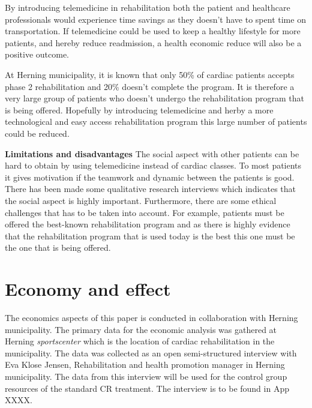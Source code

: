 By introducing telemedicine in rehabilitation both the patient and healthcare professionals would experience time savings as they doesn’t have to spent time on transportation. If telemedicine could be used to keep a healthy lifestyle for more patients, and hereby reduce readmission, a health economic reduce will also be a positive outcome. 

At Herning municipality, it is known that only 50\% of cardiac patients accepts phase 2 rehabilitation and 20\% doesn’t complete the program. It is therefore a very large group of patients who doesn’t undergo the rehabilitation program that is being offered. Hopefully by introducing telemedicine and herby a more technological and easy access rehabilitation program this large number of patients could be reduced. 

\textbf{Limitations and disadvantages} \newline
The social aspect with other patients can be hard to obtain by using telemedicine instead of cardiac classes. To most patients it gives motivation if the teamwork and dynamic between the patients is good. There has been made some qualitative research interviews which indicates that the social aspect is highly important. Furthermore, there are some ethical challenges that has to be taken into account. For example, patients must be offered the best-known rehabilitation program and as there is highly evidence that the rehabilitation program that is used today is the best this one must be the one that is being offered.     

\section{Economy and effect}

The economics aspects of this paper is conducted in collaboration with Herning municipality. The primary data for the economic analysis was gathered at Herning \textit{sportscenter} which is the location of cardiac rehabilitation in the municipality. The data was collected as an open semi-structured interview with Eva Klose Jensen, Rehabilitation and health promotion manager in Herning municipality. The data from this interview will be used for the control group resources of the standard CR treatment. The interview is to be found in App XXXX. 

